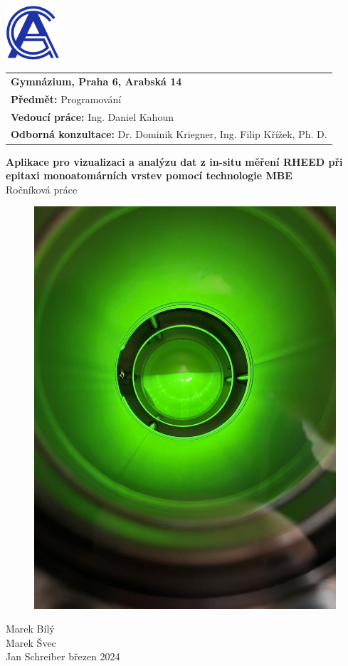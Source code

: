 \documentclass[a4paper,11pt]{article}
\begin{document}
	\thispagestyle{empty}
	
	\begin{flushleft}
		\includegraphics[width=2cm]{logo.png}
		\begin{tabular}[b]{@{}p{}}
			\large\textbf{Gymnázium, Praha 6, Arabská 14}\\
			\textbf{Předmět:} Programování\\
			\textbf{Vedoucí práce:} Ing. Daniel Kahoun\\
			\textbf{Odborná konzultace:} Dr. Dominik Kriegner, Ing. Filip Křížek, Ph. D. 
		\end{tabular}
	\end{flushleft}
	
	\begin{center}
		\vspace{1cm}
		{\Huge\textbf{Aplikace pro vizualizaci a analýzu dat z in-situ měření RHEED při epitaxi monoatomárních vrstev pomocí technologie MBE}}\\
		\vspace{0.5cm}
		Ročníková práce
		\vspace{0.5cm}
	\end{center}
	
	\begin{figure}[H]
		\centering
		\includegraphics[width=0.45 \textwidth]{title.png}
	\end{figure}

	
	\begin{flushleft}
		Marek Bílý\\
		Marek Švec\\
		Jan Schreiber
		\hspace{11cm}
		březen 2024\\
	\end{flushleft}
	
\end{document}
